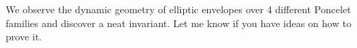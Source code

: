 We observe the dynamic geometry of elliptic envelopes over 4 different Poncelet families and discover a neat invariant. Let me know if you have ideas on how to prove it.